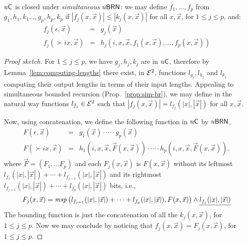 \documentclass{lmcs}
\begin{document}
\begin{theorem}
	\label{thm:sim-ubrn}
	$u \mathsf{C}$ is closed under \emph{simultaneous} $u\mathsf{BRN}$: we may define $f_1 , \dots , f_p $ from $g_1, h_1, k_1 \dots , g_p , h_p , k_p$ if $|f_j (x, \vec x)| \leq | k_j (x, \vec x)|$ for all $x, \vec x$, for $1 \leq j \leq p$, and:
	\[
	\begin{array}{rcl}
	f_j (\epsilon , \vec x) & = & g_j (\vec x) \\
	f_j (\succ i x , \vec x) & = & h_j (i, x , \vec x , f_1 (x , \vec x) , \dots , f_p (x, \vec x ))
	\end{array}
	\]
\end{theorem}
\begin{proof}
	[Proof sketch]
	For $1\leq j\leq p$, we have $g_j, h_j, k_j$ are in $u \mathsf{C}$, therefore by  Lemma~\ref{lem:computing-lengths} there exist, in $\mathcal{E}^2$, functions $l_{g_j}, l_{h_j}$ and $l_{k_j}$ computing their output lengths in terms of their input lengths. Appealing to simultaneous bounded recursion (Prop.~\ref{prop:sim-br}), we may define in the natural way functions $l_{f_j} \in \mathcal{E}^2$ such that $|f_j (x,\vec x)|=l_{f_j} (|x|,|\vec x|)$ for all $x, \vec x$.
	
	Now, using concatenation, we define the following function in $u \mathsf{C}$ by $u\mathsf{BRN}$,
	\[
	\begin{array}{rcl}
	F (\epsilon , \vec x) & = & g_1 (\vec x)\cdot\cdots\cdot  g_p (\vec x) \\
	F (\succ i x , \vec x) & = & h_1 (i, x , \vec x , \vec F(x , \vec x) ) \cdot\cdots\cdot h_p (i, x , \vec x , \vec F(x , \vec x) ),
	\end{array}
	\]
	where $\vec F = (F_1 , \dots F_p)$ and each $ F_j (x,\vec x)$ is $F(x,\vec x)$ without its leftmost $l_{f_1} (|x|,|\vec x|) +\cdots +l_{f_{j-1}} (|x|,|\vec x|)$ and its rightmost $l_{f_{j+1}} (|x|,|\vec x|)+\cdots +l_{f_p} (|x|,|\vec x|)$ bits, i.e., 
	$$
	F_j (x,\vec x) =\mathit{msp} \left({l_{f_{j+1}} ({|x|},{|\vec x|})}+\cdots+ {l_{f_p} ({|x|},{|\vec x|})}, F(x,\vec x) \right) \wedge \underline{l_{f_{j}} ({|x|},{|\vec x|})}
	$$
	The bounding function is just the concatenation of all the $k_j (x, \vec x)$, for $1\leq j\leq p$.
	Now we may conclude by noticing that $f_j (x, \vec x) = F_j (x , \vec x)$, for $1\leq j\leq p$.
\end{proof}
\end{document}
